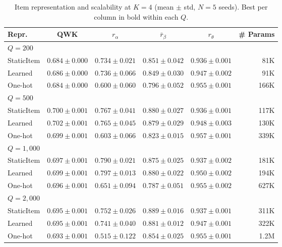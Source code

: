 \documentclass[pdflatex,sn-apa]{sn-jnl}
\begin{document}
\begin{table}[htb!]
\centering
\caption{Item representation and scalability at $K=4$ (mean $\pm$ std, $N\!=\!5$ seeds). Best per column in bold within each $Q$.}
\label{tab:recovery}
\setlength{\tabcolsep}{2pt}
\begin{tabular}{lccccr}
\toprule
\textbf{Repr.} & \textbf{QWK} & $r_\alpha$ & $\bar{r}_\beta$ & $r_\theta$ & \textbf{\# Params} \\
\midrule
\multicolumn{6}{l}{$Q=200$} \\
\cmidrule(lr){1-6}
StaticItem       & $0.684 \pm 0.000$ & $0.734 \pm 0.021$ & $\mathbf{0.851} \pm 0.042$ & $0.936 \pm 0.001$ & 81K \\
Learned & $\mathbf{0.686} \pm 0.000$ & $\mathbf{0.736} \pm 0.066$ & $0.849 \pm 0.030$ & $0.947 \pm 0.002$ & 91K \\
One-hot  & $0.684 \pm 0.000$ & $0.600 \pm 0.060$ & $0.796 \pm 0.052$ & $\mathbf{0.955} \pm 0.001$ & 166K \\
\midrule
\multicolumn{6}{l}{$Q=500$} \\
\cmidrule(lr){1-6}
StaticItem       & $0.700 \pm 0.001$ & $\mathbf{0.767} \pm 0.041$ & $\mathbf{0.880} \pm 0.027$ & $0.936 \pm 0.001$ & 117K \\
Learned & $\mathbf{0.702} \pm 0.001$ & $0.765 \pm 0.045$ & $0.879 \pm 0.029$ & $0.948 \pm 0.003$ & 130K \\
One-hot  & $0.699 \pm 0.001$ & $0.603 \pm 0.066$ & $0.823 \pm 0.015$ & $\mathbf{0.957} \pm 0.001$ & 339K \\
\midrule
\multicolumn{6}{l}{$Q=1{,}000$} \\
\cmidrule(lr){1-6}
StaticItem       & $0.697 \pm 0.001$ & $0.790 \pm 0.021$ & $0.875 \pm 0.025$ & $0.937 \pm 0.002$ & 181K \\
Learned & $\mathbf{0.699} \pm 0.001$ & $\mathbf{0.797} \pm 0.013$ & $\mathbf{0.880} \pm 0.022$ & $0.950 \pm 0.002$ & 194K \\
One-hot  & $0.696 \pm 0.001$ & $0.651 \pm 0.094$ & $0.787 \pm 0.051$ & $\mathbf{0.955} \pm 0.002$ & 627K \\
\midrule
\multicolumn{6}{l}{$Q=2{,}000$} \\
\cmidrule(lr){1-6}
StaticItem       & $\mathbf{0.695} \pm 0.001$ & $\mathbf{0.752} \pm 0.026$ & $\mathbf{0.889} \pm 0.016$ & $0.937 \pm 0.001$ & 311K \\
Learned & $\mathbf{0.695} \pm 0.001$ & $0.741 \pm 0.040$ & $0.881 \pm 0.012$ & $0.947 \pm 0.001$ & 322K \\
One-hot  & $0.693 \pm 0.001$ & $0.515 \pm 0.122$ & $0.854 \pm 0.025$ & $\mathbf{0.955} \pm 0.001$ & 1.2M \\
\bottomrule
\end{tabular}
\end{table}
\end{document}
